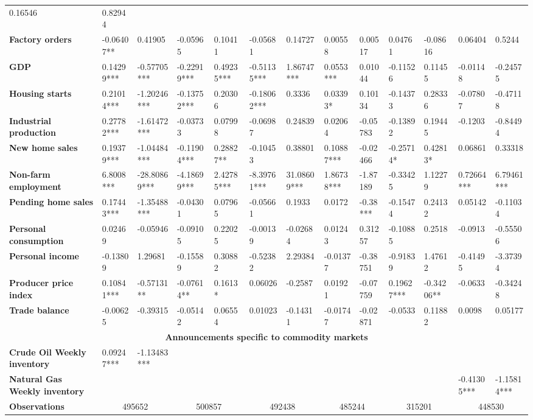 \begin{sidewaystable}
{\begin{tabular}{@{}lllllllllllll@{}}
0.16546 & 0.82944 \\ \textbf{Factory orders}& -0.06407** & 0.41905 & -0.05965 & 0.10411 & -0.05681 & 0.14727 & 0.00558 & 0.00517 & 0.04761 & -0.08616 & 0.06404 & 0.5244 \\ \textbf{GDP}& 0.14299*** & -0.57705*** & -0.22919*** & 0.49235*** & -0.51135*** & 1.86747*** & 0.0553*** & 0.01044 & -0.11526 & 0.11455 & -0.01148 & -0.24575 \\ \textbf{Housing starts}& 0.21014*** & -1.20246*** & -0.13752*** & 0.20306 & -0.18062*** & 0.3336 & 0.03393* & 0.10134 & -0.14373 & 0.28336 & -0.07807 & -0.47118 \\ \textbf{Industrial production}& 0.27782*** & -1.61472*** & -0.03733 & 0.07998 & -0.06987 & 0.24839 & 0.02064 & -0.05783 & -0.13892 & 0.19445 & -0.1203 & -0.84494 \\ \textbf{New home sales}& 0.19379*** & -1.04484*** & -0.11904*** & 0.28827** & -0.10453 & 0.38801 & 0.10887*** & -0.02466 & -0.25714* & 0.42813* & 0.06861 & 0.33318 \\ \textbf{Non-farm employment}& 6.8008*** & -28.80869*** & -4.18699*** & 2.42785*** & -8.39761*** & 31.08609*** & 1.86738*** & -1.87189 & -0.33425 & 1.12279 & 0.72664*** & 6.79461*** \\ \textbf{Pending home sales}& 0.17443*** & -1.35488*** & -0.04301 & 0.07965 & -0.05661 & 0.1933 & 0.0172 & -0.38*** & -0.15474 & 0.24132 & 0.05142 & -0.11034 \\ \textbf{Personal consumption}& 0.02469 & -0.05946 & -0.09105 & 0.22025 & -0.00139 & -0.02684 & 0.01243 & 0.31257 & -0.10885 & 0.2518 & -0.0913 & -0.55506 \\ \textbf{Personal income}& -0.13809 & 1.29681 & -0.15589 & 0.30882 & -0.52382 & 2.29384 & -0.01377 & -0.38751 & -0.91839 & 1.47612 & -0.41495 & -3.37394 \\ \textbf{Producer price index}& 0.10841*** & -0.57131** & -0.07614** & 0.1613* & 0.06026 & -0.2587 & 0.01921 & -0.07759 & 0.19627*** & -0.34206** & -0.0633 & -0.34248 \\ \textbf{Trade balance}& -0.00625 & -0.39315 & -0.05142 & 0.06554 & 0.01023 & -0.14311 & -0.01747 & -0.02871 & -0.0533 & 0.11882 & 0.0098 & 0.05177 \\  \midrule \multicolumn{13}{c}{\textbf{Announcements specific to commodity markets}} \\ \midrule \textbf{Crude Oil Weekly inventory}& 0.09247*** & -1.13483*** &  &  &  &  &  &  &  &  &  &  \\ \textbf{Natural Gas Weekly inventory}&  &  &  &  &  &  &  &  &  &  & -0.41305*** & -1.15814*** \\  \midrule \textbf{Observations}             &\multicolumn{2}{c}{ 495652 }                                                 & \multicolumn{2}{c}{ 500857 }                                                 & \multicolumn{2}{c}{ 492438 }                                                 & \multicolumn{2}{c}{ 485244 }                                                 & \multicolumn{2}{c}{ 315201 }                                                   & \multicolumn{2}{c}{ 448530 }                                                 \\ 
\end{tabular}}
\end{sidewaystable}
